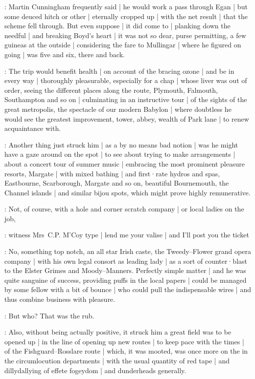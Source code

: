 :
Martin Cunningham frequently said |
he would work a pass through Egan |
but some deuced hitch or other |
eternally cropped up |
with the net result |
that the scheme fell through.
But even suppose |
it did come to |
planking down the needful |
and breaking Boyd's heart |
it was not so dear,
purse permitting,
a few guineas at the outside |
considering the fare to Mullingar |
where he figured on going |
was five and six,
there and back.

:
The trip would benefit health |
on account of the bracing ozone |
and be in every way |
thoroughly pleasurable,
especially for a chap |
whose liver was out of order,
seeing the different places along the route,
Plymouth,
Falmouth,
Southampton and so on |
culminating in an instructive tour |
of the sights of the great metropolis,
the spectacle of our modern Babylon |
where doubtless he would see the greatest improvement,
tower,
abbey,
wealth of Park lane |
to renew acquaintance with.

:
Another thing just struck him |
as a by no means bad notion |
was he might have a gaze around on the spot |
to see about trying to make arrangements |
about a concert tour of summer music |
embracing the most prominent pleasure resorts,
Margate |
with mixed bathing |
and first·rate hydros and spas,
Eastbourne,
Scarborough,
Margate and so on,
beautiful Bournemouth,
the Channel islands |
and similar bijou spots,
which might prove highly remunerative.

:
Not,
of course,
with a hole and corner scratch company |
or local ladies on the job,

:
witness Mrs~C.P. M'Coy type |
lend me your valise |
and I'll post you the ticket

:
No,
something top notch,
an all star Irish caste,
the Tweedy--Flower grand opera company |
with his own legal consort as leading lady |
as a sort of counter·blast to the Elster Grimes and Moody--Manners.
Perfectly simple matter |
and he was quite sanguine of success,
providing puffs in the local papers |
could be managed by some fellow with a bit of bounce |
who could pull the indispensable wires |
and thus combine business with pleasure.

:
But who?
That was the rub.%

:
Also,
without being actually positive,
it struck him a great field was to be opened up |
in the line of opening up new routes |
to keep pace with the times |
 of the Fishguard--Rosslare route |
which,
it was mooted,
was once more on the  in the circumlocution departments |
with the usual quantity of red tape |
and dillydallying of effete fogeydom |
and dunderheads generally.

